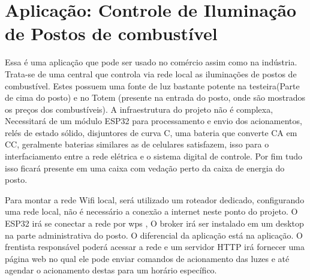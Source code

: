 \section{Aplicação: Controle de Iluminação de Postos de combustível}
\label{section:posto}


Essa é uma aplicação que pode ser usado no comércio assim como na indústria. Trata-se de uma central que controla via rede local as iluminações de postos de combustível. Estes possuem uma fonte de luz bastante potente na testeira(Parte de cima do posto) e no Totem (presente na entrada do posto, onde são mostrados os preços dos combustíveis). A infraestrutura do projeto não é complexa, Necessitará de um módulo ESP32 para processamento e envio dos acionamentos, relés de estado sólido, disjuntores de curva C, uma bateria que converte CA em CC, geralmente baterias similares as de celulares satisfazem, isso para o interfaciamento entre a rede elétrica e o sistema digital de controle. Por fim tudo isso ficará presente em uma caixa com vedação perto da caixa de energia do posto.

Para montar a rede Wifi local, será utilizado um roteador dedicado, configurando uma rede local, não é necessário a conexão a internet neste ponto do projeto. O ESP32 irá se conectar a rede por wps \cite{linksys}, O broker irá ser instalado em um desktop na parte administrativa do posto. O diferencial da aplicação está na aplicação. O frentista responsável poderá acessar a rede e um servidor HTTP irá fornecer uma página web no qual ele pode enviar comandos de acionamento das luzes e até agendar o acionamento destas para um horário específico.


